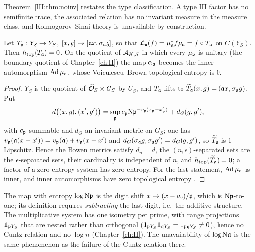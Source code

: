 \begin{remark}\label{III:rem:typeIII}
Theorem~\ref{III:thm:noinv} restates the type classification. A type $\mathrm{III}$ factor has no
semifinite trace, the associated relation has no invariant measure in the measure class, and
Kolmogorov--Sinai theory is unavailable by construction.
\end{remark}

\begin{theorem}\label{III:thm:ht}
Let $T_{\mathfrak{a}}:Y_S\to Y_S$, $[x,g]\mapsto[\mathfrak{a} x,\sigma_{\mathfrak{a}} g]$, so that
$\mathcal{L}_{\mathfrak{a}}(f)=\mu_{\mathfrak{a}}^*f\mu_{\mathfrak{a}}=f\circ T_{\mathfrak{a}}$ on $C(Y_S)$. Then $h_{\mathrm{top}}(T_{\mathfrak{a}})=0$.
On the quotient of $\mathcal{A}_{K,S}$ in which every $\mu_{\mathfrak{p}}$ is unitary (the boundary quotient
of Chapter~\ref{ch:II}) the map $\alpha_{\mathfrak{a}}$ becomes the inner automorphism $\mathrm{Ad}\,\mu_{\mathfrak{a}}$,
whose Voiculescu--Brown topological entropy \cite{Voiculescu,Brown} is $0$.
\end{theorem}

\begin{proof}
$Y_S$ is the quotient of $\widehat{\mathcal{O}}_S\times G_S$ by $U_S$, and $T_{\mathfrak{a}}$ lifts to
$\widetilde T_{\mathfrak{a}}(x,g)=(\mathfrak{a} x,\sigma_{\mathfrak{a}} g)$. Put
\[
d\bigl((x,g),(x',g')\bigr)=\sup_{\mathfrak{p}} c_{\mathfrak{p}}\mathrm{N}\mathfrak{p}^{-v_{\mathfrak{p}}(x_{\mathfrak{p}}-x'_{\mathfrak{p}})}+d_G(g,g'),
\]
with $c_{\mathfrak{p}}$ summable and $d_G$ an invariant metric on $G_S$; one has $v_{\mathfrak{p}}(\mathfrak{a}(x-x'))=v_{\mathfrak{p}}(\mathfrak{a})+v_{\mathfrak{p}}(x-x')$ and
$d_G(\sigma_{\mathfrak{a}} g,\sigma_{\mathfrak{a}} g')=d_G(g,g')$, so $\widetilde T_{\mathfrak{a}}$ is $1$-Lipschitz.
Hence the Bowen metrics satisfy $d_n=d$, the $(n,\epsilon)$-separated sets are the
$\epsilon$-separated sets, their cardinality is independent of $n$, and
$h_{\mathrm{top}}(\widetilde T_{\mathfrak{a}})=0$; a factor of a zero-entropy system has zero entropy.
For the last statement, $\mathrm{Ad}\,\mu_{\mathfrak{a}}$ is inner, and inner automorphisms have
zero topological entropy \cite{Brown}.
\end{proof}

\begin{remark}\label{III:rem:nolog}
The map with entropy $\log\mathrm{N}\mathfrak{p}$ is the digit shift $x\mapsto(x-a_0)/\mathfrak{p}$, which is
$\mathrm{N}\mathfrak{p}$-to-one; its definition requires \emph{subtracting} the last digit, i.e.\ the
additive structure. The multiplicative system has one isometry per prime, with
range projections $\mathbf 1_{\mathfrak{p} Y_S}$ that are nested rather than orthogonal
($\mathbf 1_{\mathfrak{p} Y_S}\mathbf 1_{\mathfrak{q} Y_S}=\mathbf 1_{\mathfrak{p}\mathfrak{q} Y_S}\ne0$), hence no Cuntz relation and no
$\log n$ (Chapter~\ref{ch:II}). The
unavailability of $\log\mathrm{N}\mathfrak{a}$ is the same phenomenon as the failure of the Cuntz relation
there.
\end{remark}

